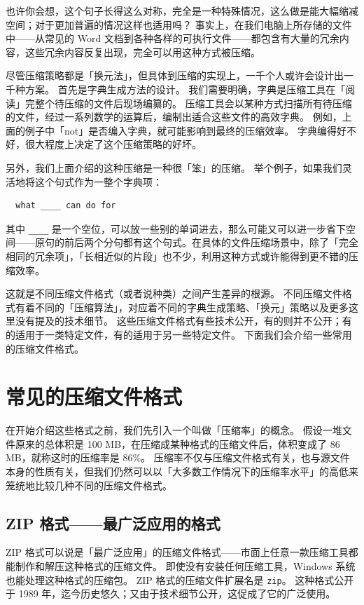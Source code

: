 也许你会想，这个句子长得这么对称，完全是一种特殊情况，这么做是能大幅缩减空间；对于更加普遍的情况这样也适用吗？
事实上，在我们电脑上所存储的文件中——从常见的 Word 文档到各种各样的可执行文件——都包含有大量的冗余内容，这些冗余内容反复出现，完全可以用这种方式被压缩。

尽管压缩策略都是「换元法」，但具体到压缩的实现上，一千个人或许会设计出一千种方案。
首先是字典生成方法的设计。
我们需要明确，字典是压缩工具在「阅读」完整个待压缩的文件后现场编纂的。
压缩工具会以某种方式扫描所有待压缩的文件，经过一系列数学的运算后，编制出适合这些文件的高效字典。
例如，上面的例子中「not」是否编入字典，就可能影响到最终的压缩效率。
字典编得好不好，很大程度上决定了这个压缩策略的好坏。

另外，我们上面介绍的这种压缩是一种很「笨」的压缩。
举个例子，如果我们灵活地将这个句式作为一整个字典项：

\begin{verbatim}
  what ____ can do for
\end{verbatim}

其中 \verb|____| 是一个空位，可以放一些别的单词进去，那么可能又可以进一步省下空间——原句的前后两个分句都有这个句式。在具体的文件压缩场景中，除了「完全相同的冗余项」，「长相近似的片段」也不少，利用这种方式或许能得到更不错的压缩效率。

这就是不同压缩文件格式（或者说种类）之间产生差异的根源。
不同压缩文件格式有着不同的「压缩算法」，对应着不同的字典生成策略、「换元」策略以及更多这里没有提及的技术细节。
这些压缩文件格式有些技术公开，有的则并不公开；有的适用于一类特定文件，有的适用于另一些特定文件。
下面我们会介绍一些常用的压缩文件格式。

\section{常见的压缩文件格式}

在开始介绍这些格式之前，我们先引入一个叫做「压缩率」的概念。
假设一堆文件原来的总体积是 100 MB，在压缩成某种格式的压缩文件后，体积变成了 86 MB，就称这时的压缩率是 86\%。
压缩率不仅与压缩文件格式有关，也与源文件本身的性质有关，但我们仍然可以以「大多数工作情况下的压缩率水平」的高低来笼统地比较几种不同的压缩文件格式。

\subsection{ZIP 格式——最广泛应用的格式}

ZIP 格式可以说是「最广泛应用」的压缩文件格式——市面上任意一款压缩工具都能制作和解压这种格式的压缩文件。
即使没有安装任何压缩工具，Windows 系统也能处理这种格式的压缩包。
ZIP 格式的压缩文件扩展名是 \verb|zip|。
这种格式公开于 1989 年，迄今历史悠久；又由于技术细节公开，这促成了它的广泛使用。

